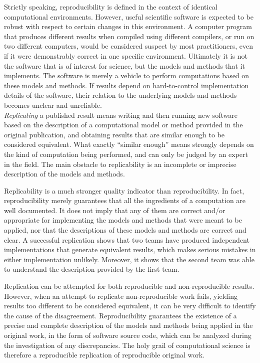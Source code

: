 \documentclass[a4paper,10pt, twocolumn]{article}
\begin{document}
Strictly speaking, reproducibility is defined in the context of
identical computational environments. However, useful scientific
software is expected to be robust with respect to certain changes in
this environment. A computer program that produces different results
when compiled using different compilers, or run on two different
computers, would be considered suspect by most practitioners, even if
it were demonstrably correct in one specific environment. Ultimately
it is not the software that is of interest for science, but the models
and methods that it implements. The software is merely a vehicle to
perform computations based on these models and methods. If results
depend on hard-to-control implementation details of the software,
their relation to the underlying models and methods becomes unclear
and unreliable.\\

\textit{Replicating} a published result means writing and then running
new software based on the description of a computational model or
method provided in the original publication, and obtaining results
that are similar enough to be considered equivalent. What exactly
``similar enough'' means strongly depends on the kind of computation
being performed, and can only be judged by an expert in the field.
The main obstacle to replicability is an incomplete or imprecise
description of the models and methods.

Replicability is a much stronger quality indicator than
reproducibility. In fact, reproducibility merely guarantees that all
the ingredients of a computation are well documented. It does not
imply that any of them are correct and/or appropriate for implementing
the models and methods that were meant to be applied, nor that the
descriptions of these models and methods are correct and clear. A
successful replication shows that two teams have produced independent
implementations that generate equivalent results, which makes serious
mistakes in either implementation unlikely. Moreover, it shows that the
second team was able to understand the description provided by the
first team.

Replication can be attempted for both reproducible and
non-reproducible results. However, when an attempt to replicate
non-reproducible work fails, yielding results too different to be
considered equivalent, it can be very difficult to identify the cause
of the disagreement. Reproducibility guarantees the existence of a
precise and complete description of the models and methods being
applied in the original work, in the form of software source code,
which can be analyzed during the investigation of any
discrepancies. The holy grail of computational science is therefore a
reproducible replication of reproducible original work.
\end{document}
